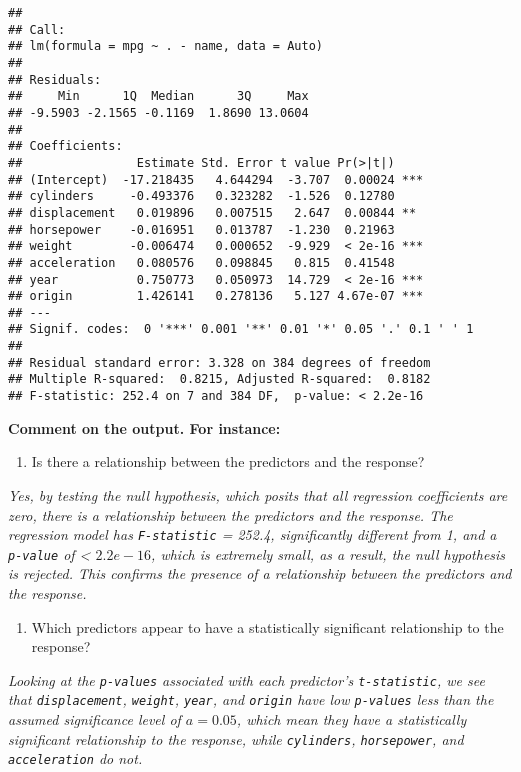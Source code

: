 \documentclass[
]{article}
\providecommand{\tightlist}{%
  \setlength{\itemsep}{0pt}\setlength{\parskip}{0pt}}
\begin{document}
\begin{verbatim}
## 
## Call:
## lm(formula = mpg ~ . - name, data = Auto)
## 
## Residuals:
##     Min      1Q  Median      3Q     Max 
## -9.5903 -2.1565 -0.1169  1.8690 13.0604 
## 
## Coefficients:
##                Estimate Std. Error t value Pr(>|t|)    
## (Intercept)  -17.218435   4.644294  -3.707  0.00024 ***
## cylinders     -0.493376   0.323282  -1.526  0.12780    
## displacement   0.019896   0.007515   2.647  0.00844 ** 
## horsepower    -0.016951   0.013787  -1.230  0.21963    
## weight        -0.006474   0.000652  -9.929  < 2e-16 ***
## acceleration   0.080576   0.098845   0.815  0.41548    
## year           0.750773   0.050973  14.729  < 2e-16 ***
## origin         1.426141   0.278136   5.127 4.67e-07 ***
## ---
## Signif. codes:  0 '***' 0.001 '**' 0.01 '*' 0.05 '.' 0.1 ' ' 1
## 
## Residual standard error: 3.328 on 384 degrees of freedom
## Multiple R-squared:  0.8215, Adjusted R-squared:  0.8182 
## F-statistic: 252.4 on 7 and 384 DF,  p-value: < 2.2e-16
\end{verbatim}

\textbf{Comment on the output. For instance:}

\begin{enumerate}
\def\labelenumi{\roman{enumi}.}
\tightlist
\item
  Is there a relationship between the predictors and the response?
\end{enumerate}

\emph{Yes, by testing the null hypothesis, which posits that all
regression coefficients are zero, there is a relationship between the
predictors and the response. The regression model has
\texttt{F-statistic} = 252.4, significantly different from 1, and a
\texttt{p-value} of \textless{} \(2.2e-16\), which is extremely small,
as a result, the null hypothesis is rejected. This confirms the presence
of a relationship between the predictors and the response.}

\begin{enumerate}
\def\labelenumi{\roman{enumi}.}
\setcounter{enumi}{1}
\tightlist
\item
  Which predictors appear to have a statistically significant
  relationship to the response?
\end{enumerate}

\emph{Looking at the \texttt{p-values} associated with each predictor's
\texttt{t-statistic}, we see that \texttt{displacement},
\texttt{weight}, \texttt{year}, and \texttt{origin} have low
\texttt{p-values} less than the assumed significance level of
\(a = 0.05\), which mean they have a statistically significant
relationship to the response, while \texttt{cylinders},
\texttt{horsepower}, and \texttt{acceleration} do not.}
\end{document}
